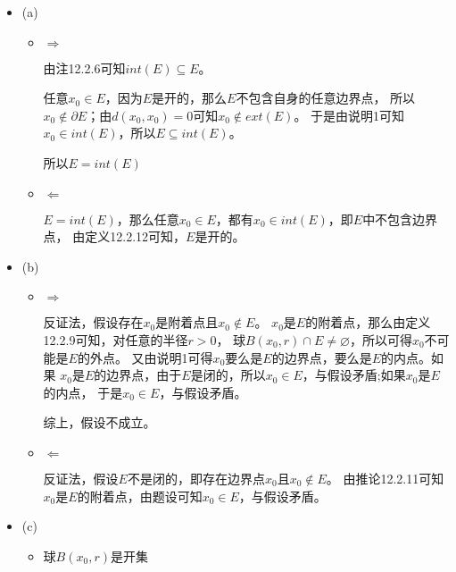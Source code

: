 \documentclass{article}
\begin{document}
\begin{itemize}
      \item (a)
            \begin{itemize}
                  \item $\Rightarrow$

                        由注12.2.6可知$int(E) \subseteq E$。

                        任意$x_0 \in E$，因为$E$是开的，那么$E$不包含自身的任意边界点，
                        所以$x_0 \notin \partial E $；由$d(x_0, x_0)=0$可知$x_0 \notin ext(E)$。
                        于是由说明1可知$x_0 \in int(E)$，所以$E \subseteq int(E)$。

                        所以$E = int(E)$
                  \item $\Leftarrow$

                        $E = int(E)$，那么任意$x_0 \in E$，都有$x_0 \in int(E)$，即$E$中不包含边界点，
                        由定义12.2.12可知，$E$是开的。
            \end{itemize}

      \item (b)
            \begin{itemize}
                  \item $\Rightarrow$

                        反证法，假设存在$x_0$是附着点且$x_0 \notin E$。
                        $x_0$是$E$的附着点，那么由定义12.2.9可知，对任意的半径$r > 0$，
                        球$B(x_0, r) \cap E \neq \varnothing$，所以可得$x_0$不可能是$E$的外点。
                        又由说明1可得$x_0$要么是$E$的边界点，要么是$E$的内点。如果
                        $x_0$是$E$的边界点，由于$E$是闭的，所以$x_0 \in E$，与假设矛盾;如果$x_0$是$E$的内点，
                        于是$x_0 \in E$，与假设矛盾。

                        综上，假设不成立。

                  \item $\Leftarrow$

                        反证法，假设$E$不是闭的，即存在边界点$x_0$且$x_0 \notin E$。
                        由推论12.2.11可知$x_0$是$E$的附着点，由题设可知$x_0 \in E$，与假设矛盾。
            \end{itemize}

      \item (c)
            \begin{itemize}
                  \item 球$B(x_0, r)$是开集


\end{itemize}
\end{itemize}
\end{document}
